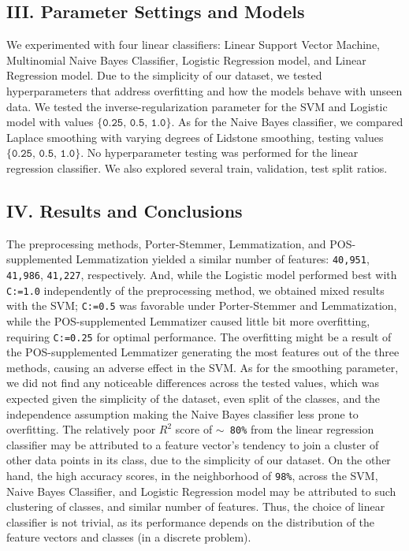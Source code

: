 \documentclass[11pt]{article}
\begin{document}
\subsection*{III. Parameter Settings and Models}
We experimented with four linear classifiers: 
Linear Support Vector Machine, 
Multinomial Naive Bayes Classifier, 
Logistic Regression model, 
and Linear Regression model. Due to the 
simplicity of our dataset, we tested hyperparameters
that address overfitting and
how the models behave with unseen data.
We tested the inverse-regularization parameter
for the SVM and Logistic model with values $\{\texttt{0.25, 0.5, 1.0}\}$.
As for the Naive Bayes classifier, 
we compared Laplace smoothing 
with varying degrees of Lidstone smoothing,
testing values $\{\texttt{0.25, 0.5, 1.0}\}$. 
No hyperparameter testing was performed for the linear regression classifier.
We also explored several train, validation, test split ratios.

\subsection*{IV. Results and Conclusions}
The preprocessing methods, Porter-Stemmer, 
Lemmatization, and POS-supplemented Lemmatization
yielded a similar number of features: 
\texttt{40,951}, \texttt{41,986}, \texttt{41,227}, respectively.
And, while the Logistic model performed best with \texttt{C:=1.0} independently of
the preprocessing method, we obtained mixed results with the SVM;
\texttt{C:=0.5} was favorable under Porter-Stemmer and Lemmatization,
while the POS-supplemented Lemmatizer caused little bit more overfitting,
requiring \texttt{C:=0.25} for optimal performance. The overfitting might 
be a result of the POS-supplemented Lemmatizer generating the most features
out of the three methods, causing an adverse effect in the SVM.
As for the smoothing parameter, 
we did not find any noticeable differences across the tested values, 
which was expected given the simplicity of the dataset, even split of the classes,
and the independence assumption making the Naive Bayes classifier less prone 
to overfitting.
The relatively poor $R^2$ score of  \texttt{$\sim$ 80\%} from the linear regression classifier
may be attributed to a feature vector's tendency to join
a cluster of other data points in its class, due to the 
simplicity of our dataset.
On the other hand,
the high accuracy scores, in the neighborhood of \texttt{98\%}, across the 
SVM, Naive Bayes Classifier, and Logistic Regression model may be attributed
to such clustering of classes, and similar number of features. 
Thus, the choice of linear classifier is not trivial, as its 
performance depends on the distribution of the feature vectors and classes (in a discrete problem).
\end{document}

